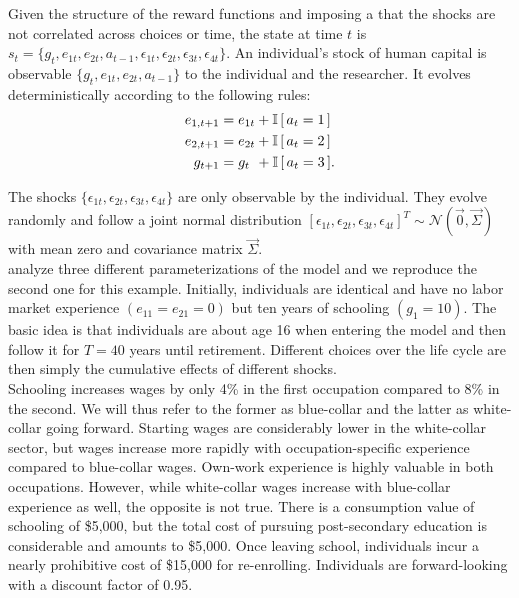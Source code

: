 \noindent Given the structure of the reward functions and imposing a that the shocks are not correlated across choices or time, the state at time $t$ is $s_t = \{g_t,e_{1t},e_{2t},a_{t - 1},\epsilon_{1t},\epsilon_{2t},\epsilon_{3t},\epsilon_{4t}\}$.
%
An individual's stock of human capital is observable $\{g_t,e_{1t},e_{2t},a_{t - 1}\}$ to the individual and the researcher. It evolves deterministically according to the following rules:
%
\begin{align*}
    e_{1,t+1} &= e_{1t} + \mathbb{I}\,[\,a_t = 1\,] \\
    e_{2,t+1} &= e_{2t} + \mathbb{I}\,[\,a_t = 2\,] \\
    g_{t+1}   &= g_{t\phantom{2}}    +  \mathbb{I}\,[\,a_t = 3\,].
\end{align*}

The shocks $\{\epsilon_{1t},\epsilon_{2t},\epsilon_{3t},\epsilon_{4t}\}$ are only observable by the individual. They evolve randomly and follow a joint normal distribution  $[\epsilon_{1t}, \epsilon_{2t}, \epsilon_{3t}, \epsilon_{4t}]^T \sim \mathcal{N}(\vec{0}, \vec{\Sigma})$ with mean zero and covariance matrix $\vec{\Sigma}$.\\

\noindent \citet{Keane.1994} analyze three different parameterizations of the model and we reproduce the second one for this example. Initially, individuals are identical and have no labor market experience $(e_{11} = e_{21} = 0)$ but ten years of schooling $(g_1 = 10)$. The basic idea is that individuals are about age 16 when entering the model and then follow it for $T = 40$ years until retirement. Different choices over the life cycle are then simply the cumulative effects of different shocks.\\

\noindent Schooling increases wages by only 4\% in the first occupation compared to 8\% in the second. We will thus refer to the former as blue-collar and the latter as white-collar going forward. Starting wages are considerably lower in the white-collar sector, but wages increase more rapidly with occupation-specific experience compared to blue-collar wages. Own-work experience is highly valuable in both occupations. However, while white-collar wages increase with blue-collar experience as well, the opposite is not true. There is a consumption value of schooling of \$5,000, but the total cost of pursuing post-secondary education is considerable and amounts to \$5,000. Once leaving school, individuals incur a nearly prohibitive cost of \$15,000 for re-enrolling. Individuals are forward-looking with a discount factor of 0.95.\\

